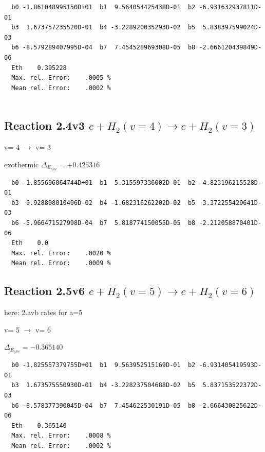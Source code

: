 \documentclass[12pt,dvipdfmx]{article}
\begin{document}
\begin{small}\begin{verbatim}
  b0 -1.861048995150D+01  b1  9.564054425438D-01  b2 -6.931632937811D-01
  b3  1.673757235520D-01  b4 -3.228920035293D-02  b5  5.838397599024D-03
  b6 -8.579289407995D-04  b7  7.454528969308D-05  b8 -2.666120439849D-06
  Eth    0.395228
  Max. rel. Error:    .0005 %
  Mean rel. Error:    .0002 %


\end{verbatim}\end{small}

\subsection{
Reaction 2.4v3
$ e + H_2(v=4) \rightarrow e + H_2(v=3) $
}

  v=  4 $\rightarrow$ v= 3

exothermic $\Delta_{E_{elec}}=+0.425316$


\begin{small}\begin{verbatim}
  b0 -1.855696064744D+01  b1  5.315597336002D-01  b2 -4.823196215528D-01
  b3  9.928898010496D-02  b4 -1.682316262202D-02  b5  3.372255429641D-03
  b6 -5.966471527998D-04  b7  5.818774150055D-05  b8 -2.212058870401D-06
  Eth    0.0
  Max. rel. Error:    .0020 %
  Mean rel. Error:    .0009 %

\end{verbatim}\end{small}

\newpage

\subsection{
Reaction 2.5v6
$ e + H_2(v=5) \rightarrow e + H_2(v=6) $
}

here: 2.avb rates for a=5


  v=  5 $\rightarrow$ v= 6


$\Delta_{E_{elec}}=-0.365140$


\begin{small}\begin{verbatim}
  b0 -1.825557379755D+01  b1  9.563952515169D-01  b2 -6.931405419593D-01
  b3  1.673575550930D-01  b4 -3.228237504688D-02  b5  5.837153522372D-03
  b6 -8.578377390045D-04  b7  7.454622530191D-05  b8 -2.666430825622D-06
  Eth    0.365140
  Max. rel. Error:    .0008 %
  Mean rel. Error:    .0002 %


\end{verbatim}\end{small}
\end{document}
